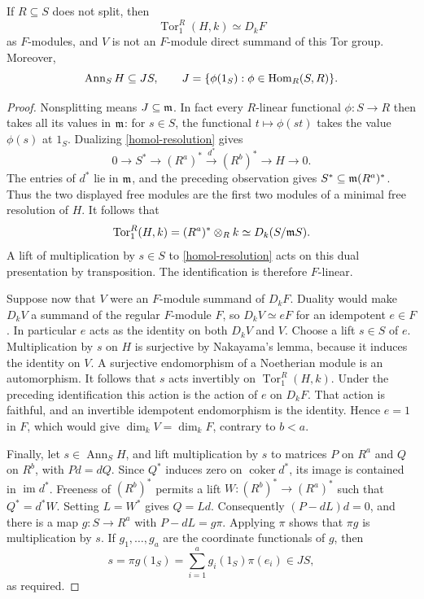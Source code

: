 \begin{lemma}\label{torob}
If $R\subseteq S$ does not split, then
\[
 \operatorname{Tor}_1^R(H,k)\simeq D_kF
\]
as $F$-modules, and $V$ is not an $F$-module direct summand of this
Tor group.  Moreover,
\[
 \operatorname{Ann}_S H\subseteq J S,
 \qquad J=\{\phi(1_S):\phi\in\operatorname{Hom}_R(S,R)\}.
\]
\end{lemma}
\begin{proof}
Nonsplitting means $J\subseteq\mathfrak m$.  In fact every $R$-linear functional
$\phi:S\to R$ then takes all its values in $\mathfrak m$: for $s\in S$, the
functional $t\mapsto\phi(st)$ takes the value $\phi(s)$ at $1_S$.
Dualizing \eqref{homol-resolution} gives
\[
 0\longrightarrow S^*\longrightarrow(R^a)^*
   \xrightarrow{d^*}(R^b)^*\longrightarrow H\longrightarrow0.
\]
The entries of $d^*$ lie in $\mathfrak m$, and the preceding observation gives
$S^*\subseteq\mathfrak m(R^a)^*$.  Thus the two displayed free modules are the
first two modules of a minimal free resolution of $H$.  It follows that
\[
 \operatorname{Tor}_1^R(H,k)=(R^a)^*\otimes_R k
    \simeq D_k(S/\mathfrak m S).
\]
A lift of multiplication by $s\in S$ to \eqref{homol-resolution}
acts on this dual presentation by transposition.  The identification
is therefore $F$-linear.

Suppose now that $V$ were an $F$-module summand of $D_kF$.
Duality would make $D_kV$ a summand of the regular $F$-module $F$,
so $D_kV\simeq eF$ for an idempotent $e\in F$.  In particular $e$
acts as the identity on both $D_kV$ and $V$.  Choose a lift $s\in S$
of $e$.  Multiplication by $s$ on $H$ is surjective by Nakayama's
lemma, because it induces the identity on $V$.  A surjective
endomorphism of a Noetherian module is an automorphism.  It follows
that $s$ acts invertibly on $\operatorname{Tor}_1^R(H,k)$.
Under the preceding identification this action is the action of $e$
on $D_kF$.  That action is faithful, and an invertible idempotent
endomorphism is the identity.  Hence $e=1$ in $F$, which would give
$\dim_kV=\dim_kF$, contrary to $b<a$.

Finally, let $s\in\operatorname{Ann}_S H$, and lift multiplication
by $s$ to matrices $P$ on $R^a$ and $Q$ on $R^b$, with
$Pd=dQ$.  Since $Q^*$ induces zero on $\operatorname{coker}d^*$,
its image is contained in $\operatorname{im}d^*$.  Freeness of
$(R^b)^*$ permits a lift $W:(R^b)^*\to(R^a)^*$ such that
$Q^*=d^*W$.  Setting $L=W^*$ gives $Q=Ld$.  Consequently
$(P-dL)d=0$, and there is a map $g:S\to R^a$ with
$P-dL=g\pi$.  Applying $\pi$ shows that $\pi g$ is multiplication
by $s$.  If $g_1,\ldots,g_a$ are the coordinate functionals of $g$,
then
\[
 s=\pi g(1_S)=\sum_{i=1}^a g_i(1_S)\pi(e_i)\in JS,
\]
as required.
\end{proof}

